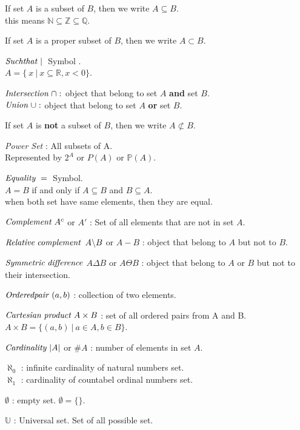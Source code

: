 \documentclass[14pt, a4paper]{article}
\begin{document}
\begin{itemize}
\begin{itemize}
            \end{itemize}

        If set $A$ is a subset of $B$, then we write $A \subseteq B$.
        \\ this means $\mathbb{N} \subseteq \mathbb{Z} \subseteq \mathbb{Q}$.

        If set $A$ is a proper subset of $B$, then we write $A \subset B$.

        ${\it{Such that}} \; | \;$  Symbol .
        \\ $A = \{ \ x \ | \ x \subseteq \mathbb{R}, x < 0 \}$.

        $\it{Intersection} \; \cap :$ object that belong to set $A$ {\bf{and}} set $B$.
        \\ $\it{Union} \; \cup  :$ object that belong to set $A$ {\bf{or}} set $B$.


        If set $A$ is {\bf{not}} a subset of $B$, then we write $A \not\subset B$.

        {\it{Power Set}} : All subsets of A.
        \\ Represented by $2^A$ or $P(A)$ or $\mathbb{P}(A)$.


        ${\it{Equality}} \; = \;$ Symbol.
        \\ $A = B$ if and only if $A \subseteq B$ and $B \subseteq A$.
        \\ when both set have same elements, then they are equal.

        ${\it{Complement}} \; A^c$ or $A'$ : Set of all elements that are not in set $A$.

        ${\it{Relative \; complement}}$ $A \symbol{92} B$ or $A-B$ : object that belong to $A$ but not to $B$.

        ${\it{Symmetric \; difference}}$ $A \Delta B$ or $A \Theta B$ : object that belong to $A$ or $B$ but not to their intersection.

        ${\it{Ordered pair}}\; (a, b)$ : collection of two elements.

        ${\it{Cartesian \; product}} \; A \times B$ : set of all ordered pairs from A and B.
        \\$A \times B = \{ (a, b) \ | \ a \in A, b \in B \}$.

        ${\it{Cardinality}} \; |A|$ or $\#A$ : number of elements in set $A$.

        $\aleph_0$ : infinite cardinality of natural numbers set.
        \\$\aleph_1$ : cardinality of countabel ordinal numbers set.

        $\emptyset$ : empty set. $\emptyset = \{\}$.

        $\mathbb{U}$ : Universal set. Set of all possible set.

    \end{itemize}
\end{document}
